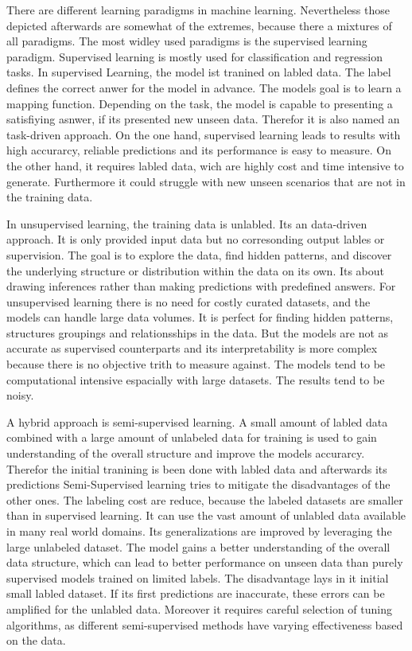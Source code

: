 There are different learning paradigms in machine learning. 
Nevertheless those depicted afterwards are somewhat of the extremes, because there a mixtures of all paradigms.
The most widley used paradigms is the supervised learning paradigm. 
Supervised learning is mostly used for classification and regression tasks.
In supervised Learning, the model ist tranined on labled data. 
The label defines the correct anwer for the model in advance.
The models goal is to learn a mapping function.
Depending on the task, the model is capable to presenting a satisfiying asnwer, if its presented new unseen data.
Therefor it is also named an task-driven approach. \citep[p.3]{sarker2021machine}
On the one hand, supervised learning leads to results with high accurarcy, reliable predictions and its performance is easy to measure.
On the other hand, it requires labled data, wich are highly cost and time intensive to generate.
Furthermore it could struggle with new unseen scenarios that are not in the training data.


In unsupervised learning, the training data is unlabled. 
Its an data-driven approach.
It is only provided input data but no corresonding output lables or supervision.
The goal is to explore the data, find hidden patterns, and discover the underlying structure or distribution within the data on its own.
Its about drawing inferences rather than making predictions with predefined answers.
For unsupervised learning there is no need for costly curated datasets, and the models can handle large data volumes.
It is perfect for finding hidden patterns, structures groupings and relationsships in the data.
But the models are not as accurate as supervised counterparts and its interpretability is more complex because there is no objective trith to measure against.
The models tend to be computational intensive espacially with large datasets. The results tend to be noisy.
\cite[p.4]{sarker2021machine}


A hybrid approach is semi-supervised learning. 
A small amount of labled data combined with a large amount of unlabeled data for training is used to gain understanding of the overall structure and improve the models accurarcy. 
Therefor the initial tranining is been done with labled data and afterwards its predictions 
Semi-Supervised learning tries to mitigate the disadvantages of the other ones. 
The labeling cost are reduce, because the labeled datasets are smaller than in supervised learning. 
It can use the vast amount of unlabled data available in many real world domains.
Its generalizations are improved by leveraging the large unlabeled dataset. \citep[p.4]{sarker2021machine}
The model gains a better understanding of the overall data structure, which can lead to better performance on unseen data than purely supervised models trained on limited labels. 
The disadvantage lays in it initial small labled dataset. If its first predictions are  inaccurate, these errors can be amplified for the unlabled data.
Moreover it requires careful selection of tuning algorithms, as different semi-supervised methods have varying effectiveness based on the data. 


